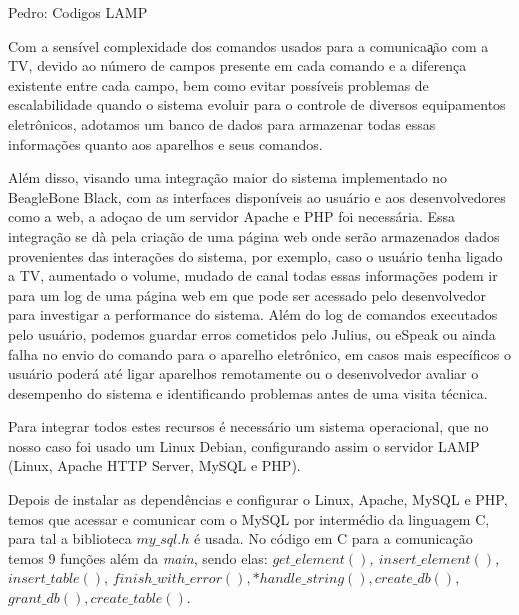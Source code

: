 \begin{section}{Pedro: Codigos LAMP}
\end{section}

Com a sens\'{i}vel complexidade dos comandos usados para a comunica\c{a}\~ {a}o
com a TV, devido ao n\'{u}mero de campos presente em cada comando e a
diferen\c{c}a existente entre cada campo, bem como evitar poss\'{i}veis
problemas de escalabilidade quando o sistema evoluir para o controle de diversos
equipamentos eletr\^{o}nicos, adotamos um banco de dados para armazenar todas
essas informa\c{c}\~{o}es quanto aos aparelhos e seus comandos.

Al\'{e}m disso, visando uma integra\c{c}\~{a}o maior do sistema implementado no
BeagleBone Black\textregistered, com as interfaces dispon\'{i}veis ao
usu\'{a}rio e aos desenvolvedores como a web, a ado\c{c}ao de um servidor Apache
e PHP foi necess\'{a}ria. Essa integra\c{c}\~{a}o se d\`{a} pela cria\c{c}\~{a}o
de uma p\'{a}gina web onde ser\~{a}o armazenados dados provenientes das
intera\c{c}\~{o}es do sistema, por exemplo, caso o usu\'{a}rio tenha ligado a
TV, aumentado o volume, mudado de canal todas essas informa\c{c}\~{o}es podem ir
para um log de uma p\'{a}gina web em que pode ser acessado pelo desenvolvedor
para investigar a performance do sistema. Al\'{e}m do log de comandos executados
pelo usu\'{a}rio, podemos guardar erros cometidos pelo Julius, ou eSpeak ou
ainda falha no envio do comando para o aparelho eletr\^{o}nico, em casos mais
espec\'{i}ficos o usu\'{a}rio poder\'{a} at\'{e} ligar aparelhos remotamente ou
o desenvolvedor avaliar o desempenho do sistema e identificando problemas antes
de uma visita t\'{e}cnica. 

Para integrar todos estes recursos \'{e} necess\'{a}rio um sistema operacional,
que no nosso caso foi usado um Linux Debian, configurando assim o servidor LAMP
(Linux, Apache HTTP Server, MySQL e PHP).

Depois de instalar as depend\^{e}ncias e configurar o Linux, Apache, MySQL e
PHP, temos que acessar e comunicar com o MySQL por interm\'{e}dio da linguagem
C, para tal a biblioteca $my\_sql.h$ \'{e} usada. No c\'{o}digo em C para a
comunica\c{c}\~{a}o temos 9 fun\c{c}\~{o}es al\'{e}m da \textit{main}, sendo
elas: \textit{$get\_element()$, $insert\_element()$, $insert\_table()$},
\textit{$finish\_with\_error(), *handle\_string(), create\_db()$},
\textit{$grant\_db(), create\_table()$}.

